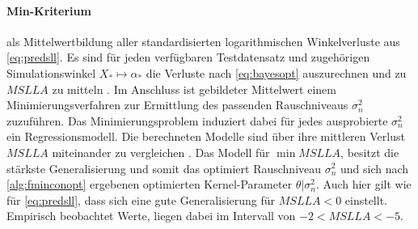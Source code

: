 \paragraph*{Min-Kriterium} als Mittelwertbildung aller standardisierten logarithmischen Winkelverluste aus \autoref{eq:predsll}. Es sind für jeden verfügbaren Testdatensatz und zugehörigen Simulationswinkel
$X_* \mapsto \alpha_*$ die Verluste nach \autoref{eq:bayesopt} auszurechnen und zu $MSLLA$ zu mitteln \cite{Rasmussen2006}. Im Anschluss ist gebildeter Mittelwert einem Minimierungsverfahren zur Ermittlung des passenden Rauschniveaus $\sigma_n^2$ zuzuführen. Das Minimierungsproblem induziert dabei für jedes ausprobierte $\sigma_n^2$ ein Regressionsmodell. Die berechneten Modelle sind über ihre mittleren Verlust $MSLLA$ miteinander zu vergleichen \cite{Rasmussen2006}. Das Modell für $\min MSLLA$, besitzt die stärkste Generalisierung und somit das optimiert Rauschniveau $\sigma_n^2$ und sich nach \autoref{alg:fminconopt} ergebenen optimierten Kernel-Parameter $\theta|\sigma_n^2$. Auch hier gilt wie für \autoref{eq:predsll}, dass sich eine gute Generalisierung für $MSLLA < 0$ einstellt. Empirisch beobachtet Werte, liegen dabei im Intervall von $-2 < MSLLA < -5$.




